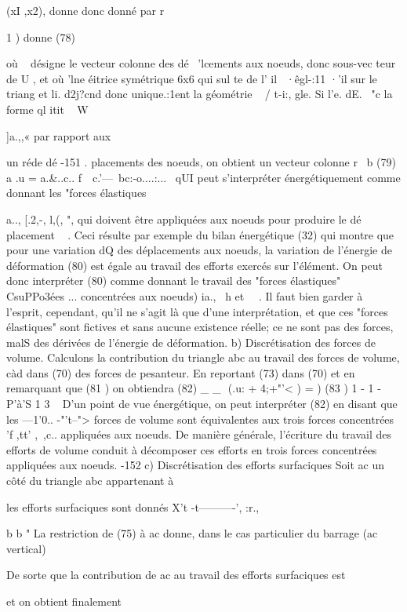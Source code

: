 {{{{{{(xI ,x2), 
donne donc 
donné par 
r 

1 
) 
donne 
(78) 

où  ~  désigne le vecteur  colonne  des  dé~  'lcements  aux  noeuds,  donc  
sous-vec teur  de  U  ,  et où  'lne  éitrice  symétrique  6x6  qui  
sul te  de  l' il ~·êgl-:11­ ·'il  sur  le  triang  et  li.  d2j?cnd  donc  unique.:1ent  
la  géométrie  ~ /  t­-i:,  gle.  
Si  l'e.  dE.  ~"c  la  forme  ql  itit  ~  W {]a.,,«­ par  rapport  aux  

un ré­de 
dé
-151 
.
placements des noeuds, on obtient un vecteur colonne r 
~b 
(79) a .u 
= a.&..c.. 
f~~c.'---~bc:-o....:...~ 
qUI peut s'interpréter énergétiquement comme donnant les "forces élastiques 
{a.., [.2,-, l,(, ", qui 
doivent être appliquées aux noeuds pour produire le dé
placement ~ . Ceci résulte par exemple du bilan énergétique (32) qui montre 
que pour une variation dQ des déplacements aux noeuds, la variation de 
l'énergie de déformation 
(80) 
est égale au travail des efforts exercés sur l'élément. On peut donc inter­préter (80) comme donnant le travail des "forces élastiques" CsuPPo3ées 
... 
concentrées aux noeuds) ia., ~h et ~~. Il faut bien garder à l'esprit, 
cependant, qu'il ne s'agit là que d'une interprétation, et que ces "forces 
élastiques" sont fictives et sans aucune existence réelle; ce ne sont pas 
des forces, malS des dérivées de l'énergie de déformation. 
b) Discrétisation des forces de volume. Calculons la contribution du triangle abc au travail des forces de volume, càd dans (70) des forces de pesanteur. En reportant (73) dans 
(70) et en remarquant que 
(81 ) 
on obtiendra 
(82) _ _  (.u: + 4;+"'< ) = 
) 
(83 ) 1 - 1 -P'à'S 1 3 ~ 
D'un point de vue énergétique, on peut interpréter (82) en disant que les 
---1'0.. -"'t--">
forces de volume sont équivalentes aux trois forces concentrées 'f ,tt' ,~,c.. appliquées aux noeuds. 
De manière générale, l'écriture du travail des efforts de volume conduit à décomposer ces efforts en trois forces concentrées appliquées aux noeuds. 
-152 ­c) Discrétisation des efforts surfaciques 
Soit ac un côté du triangle abc appartenant à 

les efforts surfaciques sont donnés 
X't -t----------', :r., 

b
b
" 
La restriction de (75) à ac donne, dans le cas particulier du barrage (ac vertical) 

De sorte que la contribution de ac au travail des efforts surfaciques est 

et on obtient finalement 

}}}}}}}}
